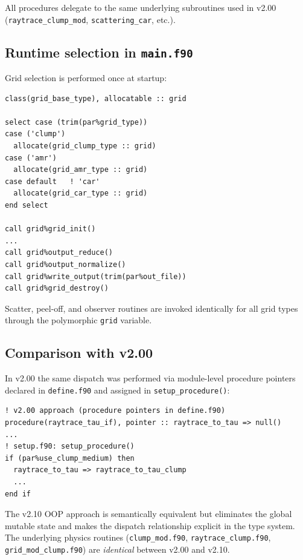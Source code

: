 \documentclass[english,a4paper]{my_memo}
\begin{document}
\begin{sloppypar}
All procedures delegate to the same underlying subroutines used in v2.00
(\texttt{raytrace\_clump\_mod}, \texttt{scattering\_car}, etc.).
\end{sloppypar}

\subsection{Runtime selection in \texttt{main.f90}}

Grid selection is performed once at startup:
\begin{lstlisting}
class(grid_base_type), allocatable :: grid

select case (trim(par%grid_type))
case ('clump')
  allocate(grid_clump_type :: grid)
case ('amr')
  allocate(grid_amr_type :: grid)
case default   ! 'car'
  allocate(grid_car_type :: grid)
end select

call grid%grid_init()
...
call grid%output_reduce()
call grid%output_normalize()
call grid%write_output(trim(par%out_file))
call grid%grid_destroy()
\end{lstlisting}

Scatter, peel-off, and observer routines are invoked identically for all
grid types through the polymorphic \texttt{grid} variable.

\subsection{Comparison with v2.00}

In v2.00 the same dispatch was performed via module-level procedure pointers
declared in \texttt{define.f90} and assigned in \texttt{setup\_procedure()}:
\begin{lstlisting}
! v2.00 approach (procedure pointers in define.f90)
procedure(raytrace_tau_if), pointer :: raytrace_to_tau => null()
...
! setup.f90: setup_procedure()
if (par%use_clump_medium) then
  raytrace_to_tau => raytrace_to_tau_clump
  ...
end if
\end{lstlisting}
\begin{sloppypar}
The v2.10 OOP approach is semantically equivalent but eliminates the global
mutable state and makes the dispatch relationship explicit in the type system.
The underlying physics routines (\texttt{clump\_mod.f90},
\texttt{raytrace\_clump.f90}, \texttt{grid\_mod\_clump.f90}) are
\emph{identical} between v2.00 and v2.10.
\end{sloppypar}
\end{document}
